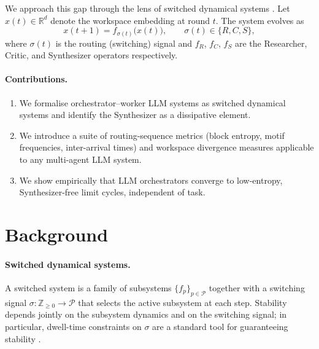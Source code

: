 \documentclass{article}
\begin{document}
We approach this gap through the lens of switched dynamical systems
\citep{liberzon2003switching}.
Let $x(t) \in \mathbb{R}^d$ denote the workspace embedding at round $t$.
The system evolves as
\begin{equation}
  x(t+1) = f_{\sigma(t)}\!\bigl(x(t)\bigr), \qquad \sigma(t) \in \{R, C, S\},
  \label{eq:switched}
\end{equation}
where $\sigma(t)$ is the routing (switching) signal and $f_R$, $f_C$, $f_S$
are the Researcher, Critic, and Synthesizer operators respectively.


\paragraph{Contributions.}
\begin{enumerate}
  \item We formalise orchestrator--worker LLM systems as switched dynamical
        systems and identify the Synthesizer as a dissipative element.
  \item We introduce a suite of routing-sequence metrics (block entropy,
        motif frequencies, inter-arrival times) and workspace divergence
        measures applicable to any multi-agent LLM system.
  \item We show empirically that LLM orchestrators converge to low-entropy,
        Synthesizer-free limit cycles, independent of task.
\end{enumerate}

\section{Background}

\paragraph{Switched dynamical systems.}
A switched system \citep{liberzon2003switching} is a family of subsystems
$\{f_p\}_{p \in \mathcal{P}}$ together with a switching signal
$\sigma : \mathbb{Z}_{\geq 0} \to \mathcal{P}$ that selects the active
subsystem at each step.
Stability depends jointly on the subsystem dynamics and on the switching
signal; in particular, dwell-time constraints on $\sigma$ are a standard
tool for guaranteeing stability \citep{liberzon2003switching}.
\end{document}
